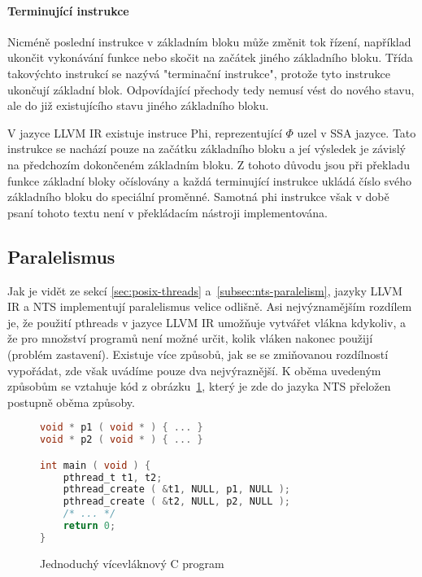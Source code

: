 \documentclass[10pt,a4paper,notitlepage]{report}
\begin{document}
\paragraph{Terminující instrukce}
Nicméně poslední instrukce v základním bloku může změnit tok řízení, například ukončit vykonávání funkce nebo skočit na začátek jiného základního bloku. Třída takovýchto instrukcí se nazývá "terminační instrukce", protože tyto instrukce ukončují základní blok. Odpovídající přechody tedy nemusí vést do nového stavu, ale do již existujícího stavu jiného základního bloku.

V jazyce LLVM IR existuje instruce Phi, reprezentující $\Phi$ uzel  v SSA jazyce. Tato instrukce se nachází pouze na začátku základního bloku a jeí výsledek je závislý na předchozím dokončeném základním bloku. Z tohoto důvodu jsou při překladu funkce základní bloky očíslovány a každá terminující instrukce ukládá číslo svého základního bloku do speciální proměnné. Samotná phi instrukce však v době psaní tohoto textu není v překládacím nástroji implementována.




\subsection{Paralelismus}
\label{subsec:paralelism}
Jak je vidět ze sekcí \ref{sec:posix-threads} a~\ref{subsec:nts-paralelism}, jazyky LLVM IR a NTS implementují paralelismus velice odlišně. Asi nejvýznamějším rozdílem je, že použití pthreads v jazyce LLVM IR umožňuje vytvářet vlákna kdykoliv, a že pro množství programů není možné určit, kolik vláken nakonec použijí (problém zastavení). Existuje více způsobů, jak se se zmiňovanou rozdílností vypořádat, zde však uvádíme pouze dva nejvýraznější. K oběma uvedeným způsobům se vztahuje kód z obrázku~\ref{fig:llvm2nts:simple-c:orig}, který je zde do jazyka NTS přeložen postupně oběma způsoby.

\begin{figure}[h]
\begin{lstlisting}[language=C]
void * p1 ( void * ) { ... }
void * p2 ( void * ) { ... }

int main ( void ) {
	pthread_t t1, t2;
	pthread_create ( &t1, NULL, p1, NULL );
	pthread_create ( &t2, NULL, p2, NULL );
	/* ... */
	return 0;
}
\end{lstlisting}
\caption{Jednoduchý vícevláknový C program}
\label{fig:llvm2nts:simple-c:orig}
\end{figure}
\end{document}
